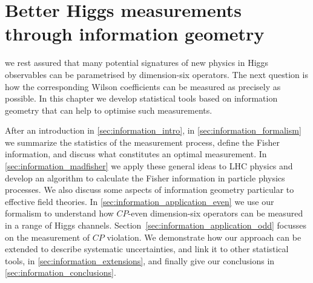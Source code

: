  






\chapter{Better Higgs measurements through information geometry}
\label{chapter:information}

 we rest assured
that many potential signatures of new physics in Higgs observables can
be parametrised by dimension-six operators. The next question is how
the corresponding Wilson coefficients can be measured as precisely as
possible. In this chapter we develop statistical tools based on
information geometry that can help to optimise such measurements.

After an introduction in \autoref{sec:information_intro}, in
\autoref{sec:information_formalism} we summarize the statistics of the
measurement process, define the Fisher information, and discuss what
constitutes an optimal measurement. In
\autoref{sec:information_madfisher} we apply these general ideas to
LHC physics and develop an algorithm to calculate the Fisher
information in particle physics processes. We also discuss some
aspects of information geometry particular to effective field
theories. In \autoref{sec:information_application_even} we use our
formalism to understand how $CP$-even dimension-six operators can be
measured in a range of Higgs channels.
Section~\autoref{sec:information_application_odd} focusses on the
measurement of $CP$ violation. We demonstrate how our approach can be
extended to describe systematic uncertainties, and link it to other
statistical tools, in \autoref{sec:information_extensions}, and
finally give our conclusions in \autoref{sec:information_conclusions}.

